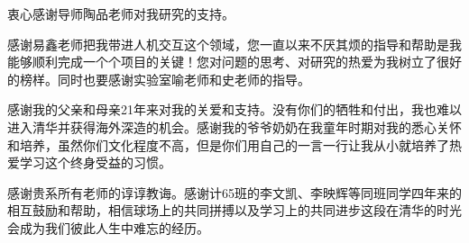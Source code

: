 
\begin{acknowledgements}
  衷心感谢导师陶品老师对我研究的支持。
  
  感谢易鑫老师把我带进人机交互这个领域，您一直以来不厌其烦的指导和帮助是我能够顺利完成一个个项目的关键！您对问题的思考、对研究的热爱为我树立了很好的榜样。同时也要感谢实验室喻老师和史老师的指导。

  感谢我的父亲和母亲21年来对我的关爱和支持。没有你们的牺牲和付出，我也难以进入清华并获得海外深造的机会。感谢我的爷爷奶奶在我童年时期对我的悉心关怀和培养，虽然你们文化程度不高，但是你们用自己的一言一行让我从小就培养了热爱学习这个终身受益的习惯。

  感谢贵系所有老师的谆谆教诲。感谢计65班的李文凯、李映辉等同班同学四年来的相互鼓励和帮助，相信球场上的共同拼搏以及学习上的共同进步这段在清华的时光会成为我们彼此人生中难忘的经历。
\end{acknowledgements}
